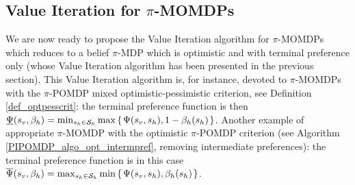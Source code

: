\subsection{Value Iteration for $\pi$-MOMDPs}
\label{section_VIpiMOMDP}
We are now ready to propose the Value Iteration algorithm for $\pi$-MOMDPs
which reduces to a belief $\pi$-MDP which is optimistic and with terminal preference only
(whose Value Iteration algorithm has been presented in the previous section).
This Value Iteration algorithm is, for instance, devoted to $\pi$-MOMDPs 
with the $\pi$-POMDP mixed optimistic-pessimistic criterion,
see Definition \ref{def_optpesscrit}: the terminal preference function is then
$\underline{\Psi}(s_v,\beta_h) = \min_{s_h \in \mathcal{S}_h} \max \left\{ \left.  \Psi(s_v,s_h) , 1 - \beta_h(s_h)  \right. \right\}$.
Another example of appropriate $\pi$-MOMDP 
with the optimistic $\pi$-POMDP criterion 
(see Algorithm \ref{PIPOMDP_algo_opt_intermpref}, removing intermediate preferences):
the terminal preference function is in this case
$\overline{\Psi}(s_v,\beta_h) = \max_{s_h \in \mathcal{S}_h} \min \left\{ \left.  \Psi(s_v,s_h) ,\beta_h(s_h)  \right. \right\}$.

